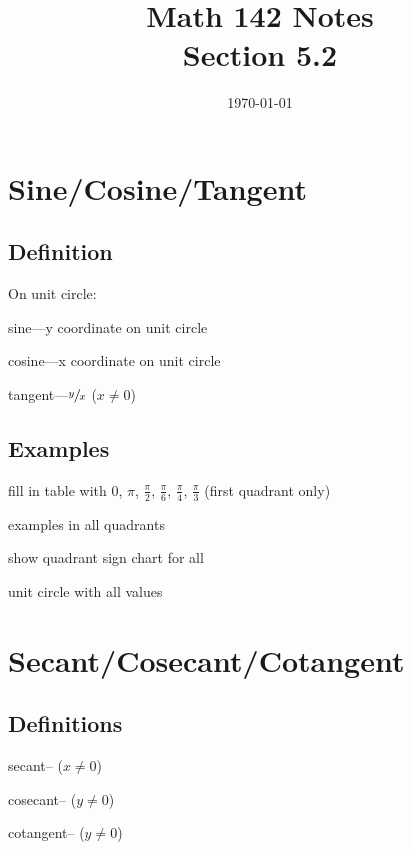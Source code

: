 \documentclass{exam}
\title{Math 142 Notes \\ Section 5.2}
\date{\today}
\begin{document}
  \maketitle
  \tableofcontents

  \section{Sine/Cosine/Tangent}

  \subsection{Definition}

  On unit circle:
  \begin{itemize*}
    \item sine---y coordinate on unit circle
    \item cosine---x coordinate on unit circle
    \item tangent---$\sfrac{y}{x}$ ($x \neq 0$)
  \end{itemize*}

  \subsection{Examples}

  \begin{itemize*}
    \item fill in table with 0, $\pi$, $\frac{\pi}{2}$, $\frac{\pi}{6}$, $\frac{\pi}{4}$, $\frac{\pi}{3}$ (first
      quadrant only)
    \item examples in all quadrants
    \item show quadrant sign chart for all
    \item unit circle with all values
  \end{itemize*}

  \section{Secant/Cosecant/Cotangent}
  \subsection{Definitions}
  \begin{itemize*}
    \item secant-- ($x \neq 0$)
    \item cosecant-- ($y \neq 0$)
    \item cotangent-- ($y \neq 0$)
  \end{itemize*}
\end{document}
